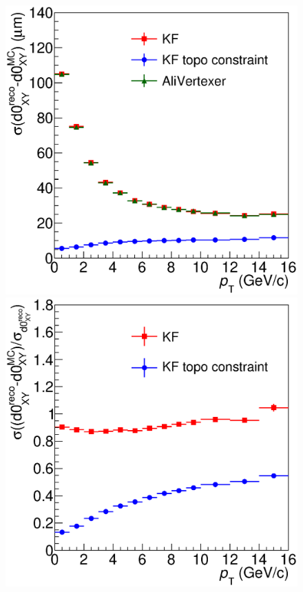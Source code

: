 \documentclass[b5paper,10pt,twoside,oldstyle,classica]{toptesi}
\begin{document}
\begin{figure}[b]
\begin{center}
{\includegraphics[scale = 0.28]{ResImpPar.eps}}
\hspace{0.cm}
{\includegraphics[scale = 0.28]{PullsImpPar.eps}}

\end{center}
\end{figure}
\end{document}
